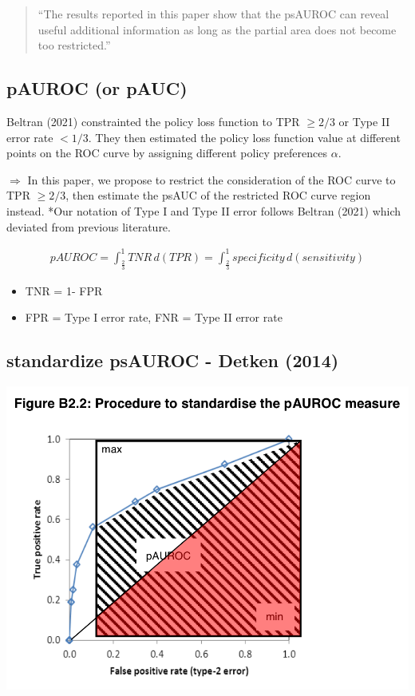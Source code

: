 \documentclass[
  12pt,
]{article}
\providecommand{\tightlist}{%
  \setlength{\itemsep}{0pt}\setlength{\parskip}{0pt}}
\begin{document}
\begin{quote}
``The results reported in this paper show that the psAUROC can reveal useful additional information as long as the partial area does not become too restricted.''
\end{quote}

\hypertarget{pauroc-or-pauc}{%
\subsection{pAUROC (or pAUC)}\label{pauroc-or-pauc}}

Beltran (2021) constrainted the policy loss function to TPR \(\ge 2/3\) or Type II error rate \(< 1/3\). They then estimated the policy loss function value at different points on the ROC curve by assigning different policy preferences \(\alpha\).

\(\Rightarrow\) In this paper, we propose to restrict the consideration of the ROC curve to TPR \(\ge 2/3\), then estimate the psAUC of the restricted ROC curve region instead. *Our notation of Type I and Type II error follows Beltran (2021) which deviated from previous literature.

\begin{align}
pAUROC = \int_{\frac{2}{3}}^1 TNR \, d(TPR) = \int_{\frac{2}{3}}^1 specificity \, d(sensitivity)
\end{align}

\begin{itemize}
\tightlist
\item
  TNR = 1- FPR
\item
  FPR = Type I error rate, FNR = Type II error rate
\end{itemize}

\hypertarget{standardize-psauroc---detken-2014}{%
\subsection{standardize psAUROC - Detken (2014)}\label{standardize-psauroc---detken-2014}}

\begin{center}\includegraphics[width=0.7\linewidth]{../metadata/pAUC} \end{center}
\end{document}
